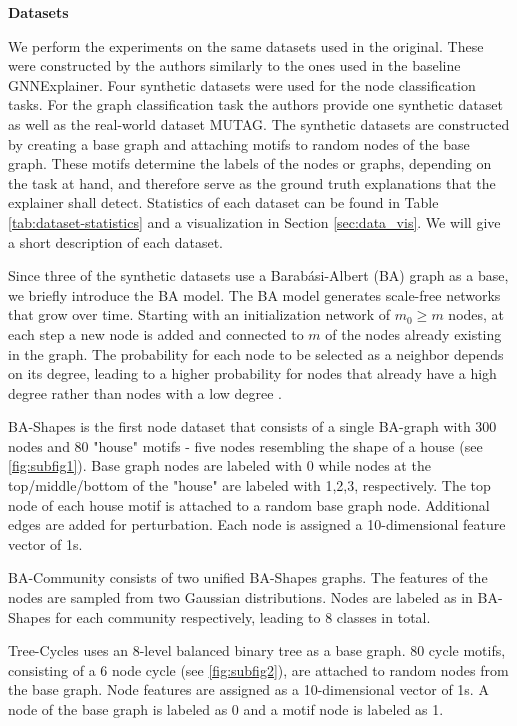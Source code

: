 \textbf{Datasets}\par
We perform the experiments on the same datasets used in the original. These were constructed by the authors similarly to the ones used in the baseline GNNExplainer. Four synthetic datasets were used for the node classification tasks. For the graph classification task the authors provide one synthetic dataset as well as the real-world dataset MUTAG. The synthetic datasets are constructed by creating a base graph and attaching motifs to random nodes of the base graph. These motifs determine the labels of the nodes or graphs, depending on the task at hand, and therefore serve as the ground truth explanations that the explainer shall detect. Statistics of each dataset can be found in Table \ref{tab:dataset-statistics} and a visualization in Section \ref{sec:data_vis}. We will give a short description of each dataset. \bigskip

Since three of the synthetic datasets use a Barabási-Albert (BA) graph as a base, we briefly introduce the BA model. The BA model generates scale-free networks that grow over time. Starting with an initialization network of $m_0 \geq m$ nodes, at each step a new node is added and connected to $m$ of the nodes already existing in the graph. The probability for each node to be selected as a neighbor depends on its degree, leading to a higher probability for nodes that already have a high degree rather than nodes with a low degree \cite{albert2002statistical}. \bigskip

BA-Shapes is the first node dataset that consists of a single BA-graph with 300 nodes and 80 "house" motifs - five nodes resembling the shape of a house (see \ref{fig:subfig1}). Base graph nodes are labeled with 0 while nodes at the top/middle/bottom of the "house" are labeled with 1,2,3, respectively. The top node of each house motif is attached to a random base graph node. Additional edges are added for perturbation. Each node is assigned a 10-dimensional feature vector of 1s.

BA-Community consists of two unified BA-Shapes graphs. The features of the nodes are sampled from two Gaussian distributions. Nodes are labeled as in BA-Shapes for each community respectively, leading to 8 classes in total.

Tree-Cycles uses an 8-level balanced binary tree as a base graph. 80 cycle motifs, consisting of a 6 node cycle (see \ref{fig:subfig2}), are attached to random nodes from the base graph. Node features are assigned as a 10-dimensional vector of 1s. A node of the base graph is labeled as 0 and a motif node is labeled as 1.

